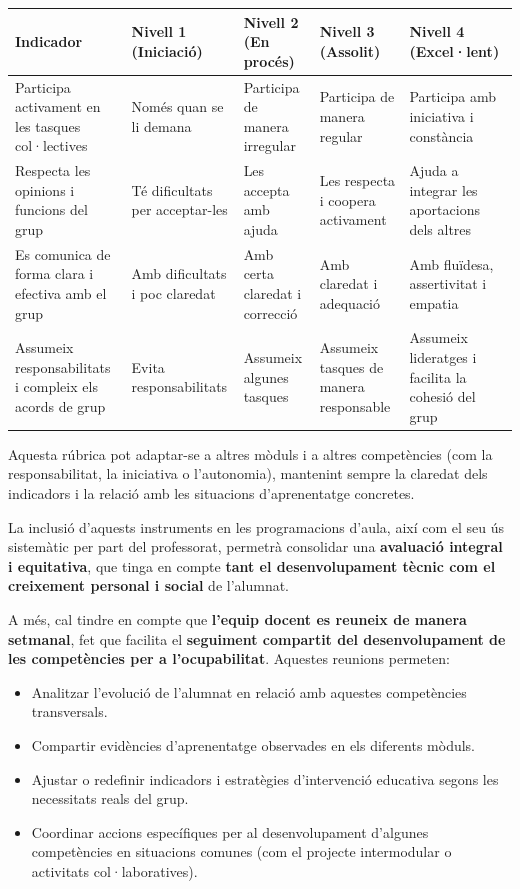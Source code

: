 \documentclass[
  paper=a4,
  ,captions=tableheading
]{scrartcl}
\providecommand{\tightlist}{%
  \setlength{\itemsep}{0pt}\setlength{\parskip}{0pt}}
\renewenvironment{quote}{\begin{customblockquote}\list{}{\rightmargin=0em\leftmargin=0em}%
\item\relax\color{blockquote-text}\ignorespaces}{\unskip\unskip\endlist\end{customblockquote}}
\begin{document}
\begin{longtable}[]{@{}lllll@{}}
\toprule
\textbf{Indicador} & \textbf{Nivell 1} (Iniciació) & \textbf{Nivell 2}
(En procés) & \textbf{Nivell 3} (Assolit) & \textbf{Nivell 4}
(Excel·lent) \\
\midrule
\endhead
Participa activament en les tasques col·lectives & Només quan se li
demana & Participa de manera irregular & Participa de manera regular &
Participa amb iniciativa i constància \\
Respecta les opinions i funcions del grup & Té dificultats per
acceptar-les & Les accepta amb ajuda & Les respecta i coopera activament
& Ajuda a integrar les aportacions dels altres \\
Es comunica de forma clara i efectiva amb el grup & Amb dificultats i
poc claredat & Amb certa claredat i correcció & Amb claredat i adequació
& Amb fluïdesa, assertivitat i empatia \\
Assumeix responsabilitats i compleix els acords de grup & Evita
responsabilitats & Assumeix algunes tasques & Assumeix tasques de manera
responsable & Assumeix lideratges i facilita la cohesió del grup \\
\bottomrule
\end{longtable}

\begin{quote}
Aquesta rúbrica pot adaptar-se a altres mòduls i a altres competències
(com la responsabilitat, la iniciativa o l'autonomia), mantenint sempre
la claredat dels indicadors i la relació amb les situacions
d'aprenentatge concretes.
\end{quote}

La inclusió d'aquests instruments en les programacions d'aula, així com
el seu ús sistemàtic per part del professorat, permetrà consolidar una
\textbf{avaluació integral i equitativa}, que tinga en compte
\textbf{tant el desenvolupament tècnic com el creixement personal i
social} de l'alumnat.

A més, cal tindre en compte que \textbf{l'equip docent es reuneix de
manera setmanal}, fet que facilita el \textbf{seguiment compartit del
desenvolupament de les competències per a l'ocupabilitat}. Aquestes
reunions permeten:

\begin{itemize}
\tightlist
\item
  Analitzar l'evolució de l'alumnat en relació amb aquestes competències
  transversals.
\item
  Compartir evidències d'aprenentatge observades en els diferents
  mòduls.
\item
  Ajustar o redefinir indicadors i estratègies d'intervenció educativa
  segons les necessitats reals del grup.
\item
  Coordinar accions específiques per al desenvolupament d'algunes
  competències en situacions comunes (com el projecte intermodular o
  activitats col·laboratives).
\end{itemize}
\end{document}
